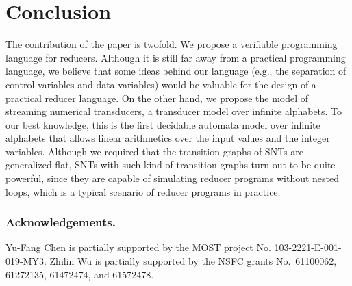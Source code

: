 	
\section{Conclusion}
\label{sec:conclusion}


The contribution of the paper is twofold. We propose a verifiable programming language for reducers. Although it is still far away from a practical programming language, we believe that some ideas behind our language (e.g., the separation of control variables and data variables) would be valuable for the design of a practical reducer language. On the other hand, we propose the model of streaming numerical transducers, a transducer model over infinite alphabets. To our best knowledge, this is the first decidable automata model over infinite alphabets that allows linear arithmetics over the input values and the integer variables. Although we required that the transition graphs of SNTs are generalized flat,  SNTs with such kind of transition graphs turn out to be quite powerful, since they are capable of simulating reducer programs without nested loops, which is a typical scenario of reducer programs in practice.


\subsubsection{Acknowledgements.} Yu-Fang Chen is partially supported by the MOST project No. 103-2221-E-001-019-MY3. Zhilin Wu is partially supported by the NSFC grants No.\ 61100062, 61272135, 61472474, and 61572478.



